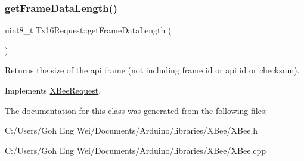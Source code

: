 \subsubsection{\texorpdfstring{get\+Frame\+Data\+Length()}{getFrameDataLength()}}
{\footnotesize\ttfamily uint8\+\_\+t Tx16\+Request\+::get\+Frame\+Data\+Length (\begin{DoxyParamCaption}{ }\end{DoxyParamCaption})\hspace{0.3cm}{\ttfamily [virtual]}}

Returns the size of the api frame (not including frame id or api id or checksum). 

Implements \hyperlink{class_x_bee_request_a03b6c558db5836fa7167c0fba7405642}{X\+Bee\+Request}.



The documentation for this class was generated from the following files\+:\begin{DoxyCompactItemize}
\item 
C\+:/\+Users/\+Goh Eng Wei/\+Documents/\+Arduino/libraries/\+X\+Bee/X\+Bee.\+h\item 
C\+:/\+Users/\+Goh Eng Wei/\+Documents/\+Arduino/libraries/\+X\+Bee/X\+Bee.\+cpp\end{DoxyCompactItemize}
